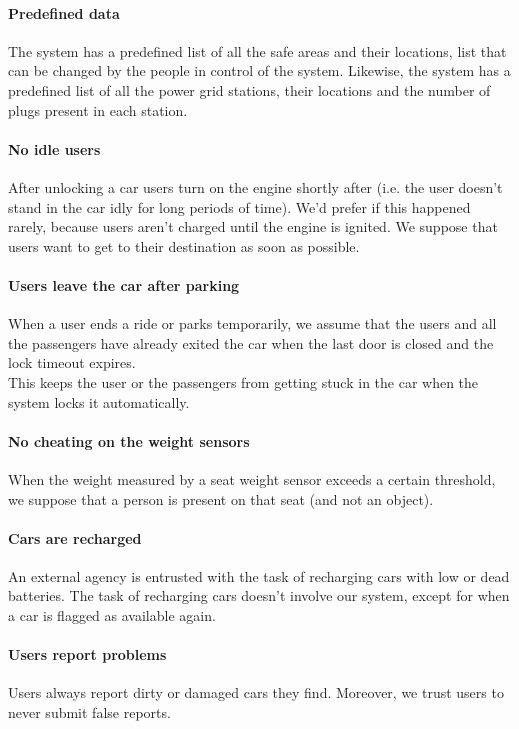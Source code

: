 \documentclass[english]{article}
\begin{document}
\paragraph{Predefined data}
The system has a predefined list of all the safe areas and their locations, list that can be changed by the people in control of the system. Likewise, the system has a predefined list of all the power grid stations, their locations and the number of plugs present in each station.

\paragraph{No idle users}
After unlocking a car users turn on the engine shortly after (i.e. the user doesn't stand in the car idly for long periods of time). We'd prefer if this happened rarely, because users aren't charged until the engine is ignited.
We suppose that users want to get to their destination as soon as possible. 

\paragraph{Users leave the car after parking}
When a user ends a ride or parks temporarily, we assume that the users and all the passengers have already exited the car when the last door is closed and the lock timeout expires. \\
This keeps the user or the passengers from getting stuck in the car when the system locks it automatically.

\paragraph{No cheating on the weight sensors}
When the weight measured by a seat weight sensor exceeds a certain threshold, we suppose that a person is present on that seat (and not an object).

\paragraph{Cars are recharged}
An external agency is entrusted with the task of recharging cars with low or dead batteries. The task of recharging cars doesn't involve our system, except for when a car is flagged as available again.

\paragraph{Users report problems}
Users always report dirty or damaged cars they find. Moreover, we trust users to never submit false reports.
\end{document}
